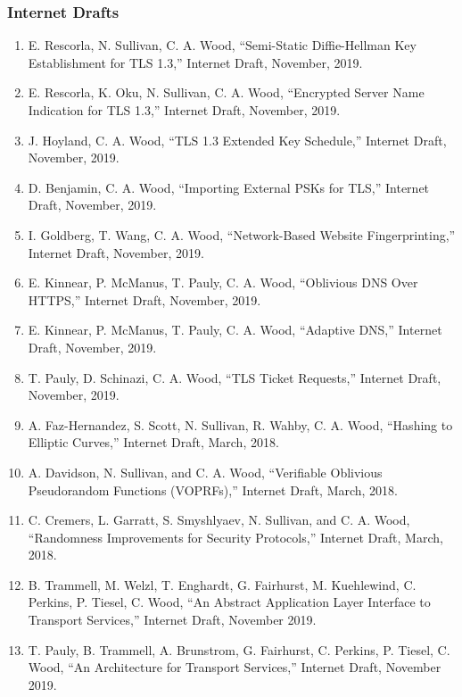 \documentclass[10pt]{res}
\begin{document}
\begin{resume}
\subsubsection*{Internet Drafts}
\begin{enumerate}[D-1.]
    \item E. Rescorla, N. Sullivan, C. A. Wood, ``Semi-Static Diffie-Hellman Key Establishment for TLS 1.3,'' Internet Draft, November, 2019.
    \item E. Rescorla, K. Oku, N. Sullivan, C. A. Wood, ``Encrypted Server Name Indication for TLS 1.3,'' Internet Draft, November, 2019.
    \item J. Hoyland, C. A. Wood, ``TLS 1.3 Extended Key Schedule,'' Internet Draft, November, 2019.
    \item D. Benjamin, C. A. Wood, ``Importing External PSKs for TLS,'' Internet Draft, November, 2019.
    \item I. Goldberg, T. Wang, C. A. Wood, ``Network-Based Website Fingerprinting,'' Internet Draft, November, 2019.
    \item E. Kinnear, P. McManus, T. Pauly, C. A. Wood, ``Oblivious DNS Over HTTPS,'' Internet Draft, November, 2019.
    \item E. Kinnear, P. McManus, T. Pauly, C. A. Wood, ``Adaptive DNS,'' Internet Draft, November, 2019.
    \item T. Pauly, D. Schinazi, C. A. Wood, ``TLS Ticket Requests,'' Internet Draft, November, 2019.
    \item A. Faz-Hernandez, S. Scott, N. Sullivan, R. Wahby, C. A. Wood, ``Hashing to Elliptic Curves,'' Internet Draft, March, 2018. 
    \item A. Davidson, N. Sullivan, and C. A. Wood, ``Verifiable Oblivious Pseudorandom Functions (VOPRFs),'' Internet Draft, March, 2018.
    \item C. Cremers, L. Garratt, S. Smyshlyaev, N. Sullivan, and C. A. Wood, ``Randomness Improvements for Security Protocols,'' Internet Draft, March, 2018.
    \item B. Trammell, M. Welzl, T. Enghardt, G. Fairhurst, M. Kuehlewind, C. Perkins, P. Tiesel, C. Wood, ``An Abstract Application Layer Interface to Transport Services,'' Internet Draft, November 2019.
    \item T. Pauly, B. Trammell, A. Brunstrom, G. Fairhurst, C. Perkins, P. Tiesel, C. Wood, ``An Architecture for Transport Services,'' Internet Draft, November 2019.

\end{enumerate}
\end{resume}
\end{document}

